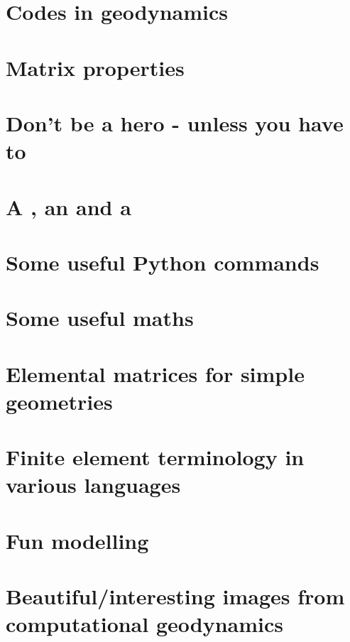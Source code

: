 \documentclass[a4paper,12pt]{report}
\begin{document}
\chapter{Codes in geodynamics \label{app:codes} } %
\chapter{Matrix properties}  %
\chapter{Don't be a hero - unless you have to}  %
\chapter{A \fantom, an \elefant and a \ghost}  %
\chapter{Some useful Python commands}  %
\chapter{Some useful maths}  \label{app_maths} %
\chapter{Elemental matrices for simple geometries}\label{app:mm}  %
\chapter{Finite element terminology in various languages}  %
\chapter{Fun modelling}  %
\chapter{Beautiful/interesting images from computational geodynamics} %
\end{document}
